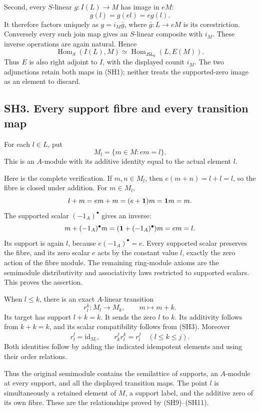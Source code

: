 \documentclass[
]{article}
\begin{document}
Second, every \(S\)-linear \(g:I(L)\to M\) has image in \(eM\): \[
g(l)=g(el)=eg(l).
\tag{SH7}
\] It therefore factors uniquely as \(g=i_M\bar g\), where
\(\bar g:L\to eM\) is its corestriction. Conversely every such join map
gives an \(S\)-linear composite with \(i_M\). These inverse operations
are again natural. Hence \[
\operatorname{Hom}_S(I(L),M)
\simeq\operatorname{Hom}_{\mathsf{JSL}_0}(L,E(M)).
\tag{SH8}
\] Thus \(E\) is also right adjoint to \(I\), with the displayed counit
\(i_M\). The two adjunctions retain both maps in (SH1); neither treats
the supported-zero image as an element to discard.

\subsection{SH3. Every support fibre and every transition
map}\label{sh3.-every-support-fibre-and-every-transition-map}

For each \(l\in L\), put \[
M_l=\{m\in M:em=l\}.
\tag{SH9}
\] This is an \(A\)-module with its additive identity equal to the
actual element \(l\).

Here is the complete verification. If \(m,n\in M_l\), then
\(e(m+n)=l+l=l\), so the fibre is closed under addition. For
\(m\in M_l\), \[
l+m=em+m=(e+{\bf1})m={\bf1}m=m.
\] The supported scalar \((-1_A)^\bullet\) gives an inverse: \[
m+(-1_A)^\bullet m=({\bf1}+(-1_A)^\bullet)m=em=l.
\] Its support is again \(l\), because \(e(-1_A)^\bullet=e\). Every
supported scalar preserves the fibre, and its zero scalar \(e\) acts by
the constant value \(l\), exactly the zero action of the fibre module.
The remaining ring-module axioms are the semimodule distributivity and
associativity laws restricted to supported scalars. This proves the
assertion.

When \(l\le k\), there is an exact \(A\)-linear transition \[
r_l^k:M_l\longrightarrow M_k,\qquad m\longmapsto m+k.
\tag{SH10}
\] Its target has support \(l+k=k\). It sends the zero \(l\) to \(k\).
Its additivity follows from \(k+k=k\), and its scalar compatibility
follows from (SH3). Moreover \[
r_l^l=\mathrm{id}_{M_l},\qquad r_k^j r_l^k=r_l^j
\quad(l\le k\le j).
\tag{SH11}
\] Both identities follow by adding the indicated idempotent elements
and using their order relations.

Thus the original semimodule contains the semilattice of supports, an
\(A\)-module at every support, and all the displayed transition maps.
The point \(l\) is simultaneously a retained element of \(M\), a support
label, and the additive zero of its own fibre. These are the
relationships proved by (SH9)--(SH11).
\end{document}
